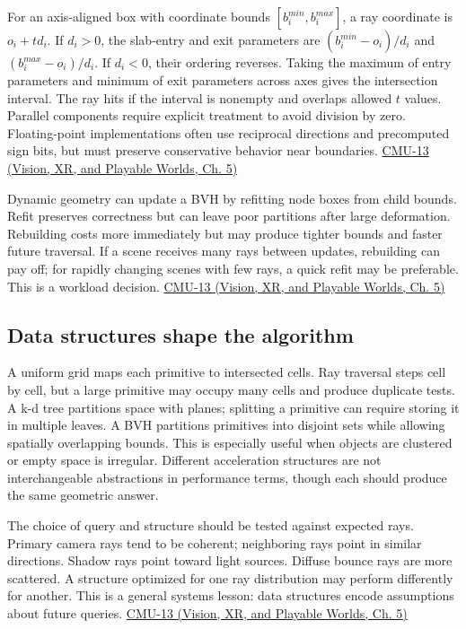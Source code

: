 For an axis-aligned box with coordinate bounds \([b_i^{min},b_i^{max}]\), a ray coordinate is \(o_i+td_i\). If \(d_i>0\), the slab-entry and exit parameters are \((b_i^{min}-o_i)/d_i\) and \((b_i^{max}-o_i)/d_i\). If \(d_i<0\), their ordering reverses. Taking the maximum of entry parameters and minimum of exit parameters across axes gives the intersection interval. The ray hits if the interval is nonempty and overlaps allowed \(t\) values. Parallel components require explicit treatment to avoid division by zero. Floating-point implementations often use reciprocal directions and precomputed sign bits, but must preserve conservative behavior near boundaries. \href{../07-Vision-XR-and-Playable-Worlds/main.pdf\#nameddest=04-visual-computing-ii-ch036-cmu-13---spatial-data-structures}{CMU-13 (Vision, XR, and Playable Worlds, Ch. 5)}

Dynamic geometry can update a BVH by refitting node boxes from child bounds. Refit preserves correctness but can leave poor partitions after large deformation. Rebuilding costs more immediately but may produce tighter bounds and faster future traversal. If a scene receives many rays between updates, rebuilding can pay off; for rapidly changing scenes with few rays, a quick refit may be preferable. This is a workload decision. \href{../07-Vision-XR-and-Playable-Worlds/main.pdf\#nameddest=04-visual-computing-ii-ch036-cmu-13---spatial-data-structures}{CMU-13 (Vision, XR, and Playable Worlds, Ch. 5)}

\subsection{Data structures shape the algorithm}\label{04-visual-computing-ii-ch029-data-structures-shape-the-algorithm}

A uniform grid maps each primitive to intersected cells. Ray traversal steps cell by cell, but a large primitive may occupy many cells and produce duplicate tests. A k-d tree partitions space with planes; splitting a primitive can require storing it in multiple leaves. A BVH partitions primitives into disjoint sets while allowing spatially overlapping bounds. This is especially useful when objects are clustered or empty space is irregular. Different acceleration structures are not interchangeable abstractions in performance terms, though each should produce the same geometric answer.

The choice of query and structure should be tested against expected rays. Primary camera rays tend to be coherent; neighboring rays point in similar directions. Shadow rays point toward light sources. Diffuse bounce rays are more scattered. A structure optimized for one ray distribution may perform differently for another. This is a general systems lesson: data structures encode assumptions about future queries. \href{../07-Vision-XR-and-Playable-Worlds/main.pdf\#nameddest=04-visual-computing-ii-ch036-cmu-13---spatial-data-structures}{CMU-13 (Vision, XR, and Playable Worlds, Ch. 5)}

